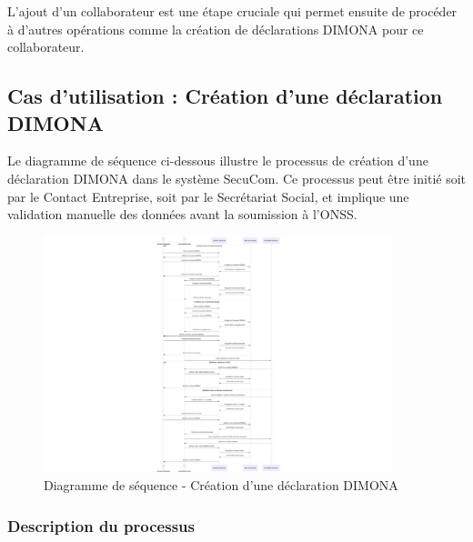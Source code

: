 \documentclass[12pt,a4paper]{report}
\begin{document}
L'ajout d'un collaborateur est une étape cruciale qui permet ensuite de procéder à d'autres opérations comme la création de déclarations DIMONA pour ce collaborateur.

\subsection{Cas d'utilisation : Création d'une déclaration DIMONA}

Le diagramme de séquence ci-dessous illustre le processus de création d'une déclaration DIMONA dans le système SecuCom. Ce processus peut être initié soit par le Contact Entreprise, soit par le Secrétariat Social, et implique une validation manuelle des données avant la soumission à l'ONSS.

\begin{figure}[h]
\centering
\includegraphics[width=0.9\textwidth]{SD_creation_dimona.png}
\caption{Diagramme de séquence - Création d'une déclaration DIMONA}
\end{figure}

\subsubsection{Description du processus}
\end{document}
